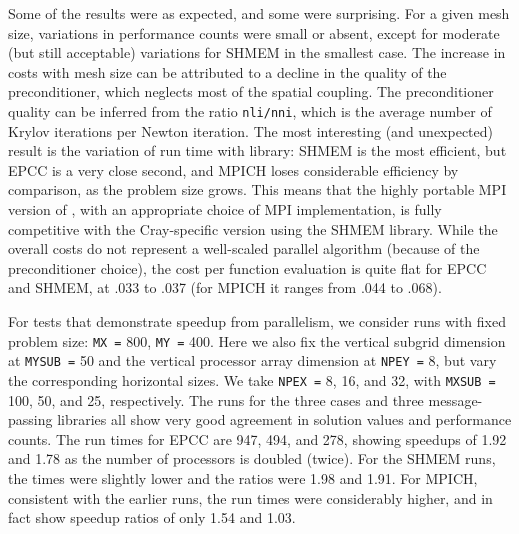 Some of the results were as expected, and some were surprising. For a given
mesh size, variations in performance counts were small or absent, except for
moderate (but still acceptable) variations for SHMEM in the smallest case.
The increase in costs with mesh size can be attributed to a decline in the
quality of the preconditioner, which neglects most of the spatial coupling.
The preconditioner quality can be inferred from the ratio {\tt nli/nni},
which is the average number of Krylov iterations per Newton iteration. The
most interesting (and unexpected) result is the variation of run time with
library: SHMEM is the most efficient, but EPCC is a very close second, and
MPICH loses considerable efficiency by comparison, as the problem size
grows. This means that the highly portable MPI version of {\cvode}, with an
appropriate choice of MPI implementation, is fully competitive with the
Cray-specific version using the SHMEM library. While the overall costs do
not represent a well-scaled parallel algorithm (because of the
preconditioner choice), the cost per function evaluation is quite flat for
EPCC and SHMEM, at .033 to .037 (for MPICH it ranges from .044 to .068).

For tests that demonstrate speedup from parallelism, we consider runs with
fixed problem size: {\tt MX =} 800, {\tt MY =} 400. Here we also fix the
vertical subgrid dimension at {\tt MYSUB =} 50 and the vertical processor
array dimension at {\tt NPEY =} 8, but vary the corresponding horizontal
sizes. We take {\tt NPEX =} 8, 16, and 32, with {\tt MXSUB =} 100, 50, and
25, respectively. The runs for the three cases and three message-passing
libraries all show very good agreement in solution values and performance
counts. The run times for EPCC are 947, 494, and 278, showing speedups of
1.92 and 1.78 as the number of processors is doubled (twice). For the SHMEM
runs, the times were slightly lower and the ratios were 1.98 and 1.91. For
MPICH, consistent with the earlier runs, the run times were considerably
higher, and in fact show speedup ratios of only 1.54 and 1.03.
